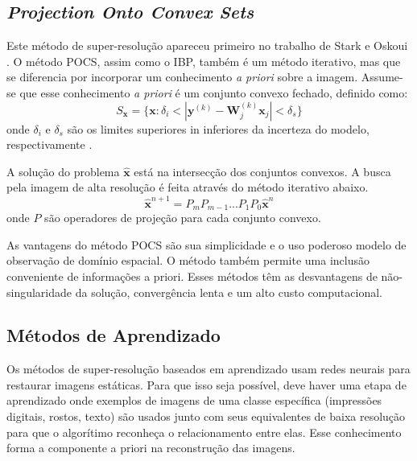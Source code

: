 \subsection{\emph{Projection Onto Convex Sets}}
Este método de super-resolução apareceu primeiro no trabalho de Stark e Oskoui \cite{stark1989high}.
O método POCS, assim como o IBP, também é um método iterativo, mas que se diferencia por incorporar um conhecimento \emph{a priori} sobre a imagem. Assume-se que esse conhecimento \emph{a priori} é um conjunto convexo fechado, definido como:
\begin{equation}
	S_{\mathbf{x}} = \{ \mathbf{x} : \delta_i < |\mathbf{y}^{(k)}-\mathbf{W}^{(k)}_j \mathbf{x}_j| < \delta_s \}
\end{equation}
onde $\delta_i$ e $\delta_s$ são os limites superiores in inferiores da incerteza do modelo, respectivamente \cite{nasrollahi2014super}.

A solução do problema $\hat{\mathbf{x}}$ está na intersecção dos conjuntos convexos. A busca pela imagem de alta resolução é feita através do método iterativo abaixo\cite{reis2014metodo}.
\begin{equation}
	\hat{\mathbf{x}}^{n+1} = P_m P_{m-1} ... P_1 P_0 \hat{\mathbf{x}}^{n}
\end{equation}
onde $P$ são operadores de projeção para cada conjunto convexo.

\begin{citacao}
As vantagens do método POCS são sua simplicidade e o uso poderoso modelo de observação de domínio espacial. O método também permite uma inclusão conveniente de informações a priori. Esses métodos têm as desvantagens de não-singularidade da solução, convergência lenta e um alto custo computacional. \cite{park2003super}
\end{citacao}

\subsection{Métodos de Aprendizado}
Os métodos de super-resolução baseados em aprendizado usam redes neurais para restaurar imagens estáticas.
Para que isso seja possível, deve haver uma etapa de aprendizado onde exemplos de imagens de uma classe específica (impressões digitais, rostos, texto) são usados junto com seus equivalentes de baixa resolução para que o algorítimo reconheça o relacionamento entre elas.
Esse conhecimento forma a componente a priori na reconstrução das imagens.

